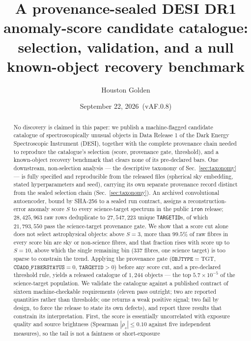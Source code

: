 \documentclass[aps,prd,twocolumn,superscriptaddress,nofootinbib,longbibliography,floatfix]{revtex4-2}
\newcommand{\paperVersion}{vAF.0.8}
\newcommand{\paperTimestamp}{September 22, 2026}
\newcommand{\TARGETID}{\texttt{TARGETID}}
\newcommand{\OBJTYPE}{\texttt{OBJTYPE}}
\begin{document}
\title{A provenance-sealed DESI DR1 anomaly-score candidate catalogue: selection,
validation, and a null known-object recovery benchmark}

\author{Houston Golden}

\date{\paperTimestamp\ (\paperVersion)}

\begin{abstract}
No discovery is claimed in this paper: we publish a machine-flagged candidate
catalogue of spectroscopically unusual objects in Data Release 1 of the Dark
Energy Spectroscopic Instrument (DESI), together with the complete provenance
chain needed to reproduce the catalogue's selection (score, provenance gate,
threshold), and a known-object recovery benchmark that clears none of its
pre-declared bars. One downstream, non-selection analysis --- the descriptive
taxonomy of Sec.~\ref{sec:taxonomy} --- is fully specified and reproducible
from the released files (spherical sky embedding, stated hyperparameters and
seed), carrying its own separate provenance record distinct from the sealed
selection chain (Sec.~\ref{sec:taxonomy}). An archived convolutional autoencoder,
bound by SHA-256 to a sealed run contract, assigns a reconstruction-error
anomaly score $S$ to every science-target spectrum in the public
\texttt{iron} release; $28{,}425{,}963$ raw rows deduplicate to
$27{,}547{,}223$ unique \TARGETID s, of which $21{,}793{,}550$ pass the
science-target provenance gate. We show that a score cut alone does
not select astrophysical objects: above $S=3$, more than $99.5\%$ of raw
fibres in every score bin are sky or non-science fibres, and that fraction
rises with score up to $S=10$, above which the single remaining bin (337
fibres, one science target) is too sparse to constrain the trend. Applying the
provenance gate ($\OBJTYPE = \mathrm{TGT}$, $\texttt{COADD\_FIBERSTATUS} = 0$,
$\TARGETID > 0$) before any score cut, and a pre-declared threshold rule,
yields a released catalogue of $1{,}244$ objects --- the top
$5.7\times10^{-5}$ of the science-target population. We validate the catalogue
against a published contract of sixteen machine-checkable requirements
(eleven pass outright; two are reported quantities rather than thresholds;
one returns a weak positive signal; two fail by design, to force the release
to state its own defects), and report three results that constrain its
interpretation. First, the score is essentially uncorrelated with exposure
quality and source brightness (Spearman $|\rho_s| \le 0.10$ against five
independent measures), so the tail is not a faintness or short-exposure

\end{abstract}
\end{document}
